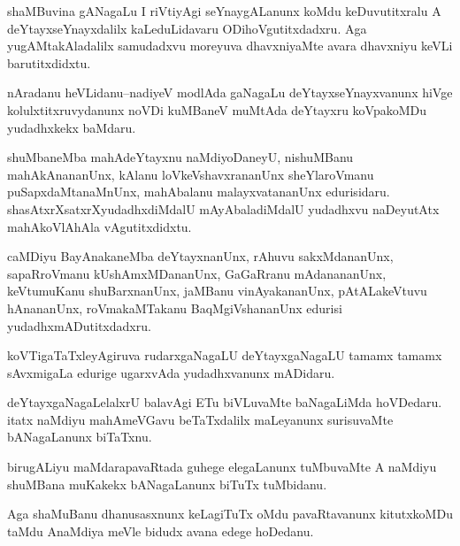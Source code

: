 \documentclass{article}
\begin{document}
\begin{mn}%
shaMBuvina gANagaLu I riVtiyAgi seYnaygALanunx koMdu keDuvutitxralu A deYtayxseYnayxdalilx 
kaLeduLidavaru ODihoVgutitxdadxru. Aga yugAMtakAladalilx samudadxvu moreyuva dhavxniyaMte 
avara dhavxniyu keVLi barutitxdidxtu.
\end{mn}


\begin{mn}%
nAradanu heVLidanu--nadiyeV modlAda gaNagaLu deYtayxseYnayxvanunx hiVge kolulxtitxruvydanunx 
noVDi kuMBaneV muMtAda deYtayxru koVpakoMDu yudadhxkekx baMdaru.
\end{mn}

\begin{mn}%
shuMbaneMba mahAdeYtayxnu naMdiyoDaneyU, nishuMBanu mahAkAnananUnx, kAlanu 
loVkeVshavxrananUnx sheYlaroVmanu puSapxdaMtanaMnUnx, mahAbalanu malayxvatananUnx 
edurisidaru. shasAtxrXsatxrXyudadhxdiMdalU mAyAbaladiMdalU yudadhxvu naDeyutAtx mahAkoVlAhAla
vAgutitxdidxtu.
\end{mn}

\begin{mn}%
caMDiyu BayAnakaneMba deYtayxnanUnx, rAhuvu sakxMdananUnx, sapaRroVmanu kUshAmxMDananUnx, 
GaGaRranu mAdanananUnx, keVtumuKanu shuBarxnanUnx, jaMBanu vinAyakananUnx, pAtALakeVtuvu 
hAnananUnx, roVmakaMTakanu BaqMgiVshananUnx edurisi yudadhxmADutitxdadxru.
\end{mn}

\begin{mn}%
koVTigaTaTxleyAgiruva rudarxgaNagaLU deYtayxgaNagaLU tamamx tamamx sAvxmigaLa edurige 
ugarxvAda yudadhxvanunx mADidaru.
\end{mn}

\begin{mn}%
deYtayxgaNagaLelalxrU balavAgi ETu biVLuvaMte baNagaLiMda hoVDedaru. itatx naMdiyu 
mahAmeVGavu beTaTxdalilx maLeyanunx surisuvaMte bANagaLanunx biTaTxnu.
\end{mn}

\begin{mn}%
birugALiyu maMdarapavaRtada guhege elegaLanunx tuMbuvaMte A naMdiyu shuMBana muKakekx 
bANagaLanunx biTuTx tuMbidanu.
\end{mn}

\begin{mn}%
Aga shaMuBanu dhanusasxnunx keLagiTuTx oMdu pavaRtavanunx kitutxkoMDu taMdu AnaMdiya meVle 
bidudx avana edege hoDedanu.
\end{mn}
\end{document}
